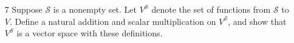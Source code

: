 \documentclass[11pt, b5paper, draft, fleqn]{book}
\theoremstyle{remark}
\theoremstyle{definition}
\begin{document}
\begin{enumerate}
\begin{proof}
		For the converse, suppose \(0 \mathbf{v} = \mathbf{0}\). Adding \(\mathbf{v}\) to both sides, we get \(0 \mathbf{v} + \mathbf{v} = 0 \mathbf{v} + 1 \mathbf{v} = \mathbf{0} + \mathbf{v}\), and so \((0 +1) \mathbf{v} = 1 \mathbf{v} = \mathbf{v} = \mathbf{0} + \mathbf{v}\), which completes our proof.
	\end{proof}
	
	\item[7] Suppose \(\mathcal{S}\) is a nonempty set. Let \(V^{\mathcal{S}}\) denote the set of functions from \(\mathcal{S}\) to \(V\). Define a natural addition and scalar multiplication on \(V^{\mathcal{S}}\), and show that \(V^{\mathcal{S}}\) is a vector space with these definitions.
\end{enumerate}
\end{document}
